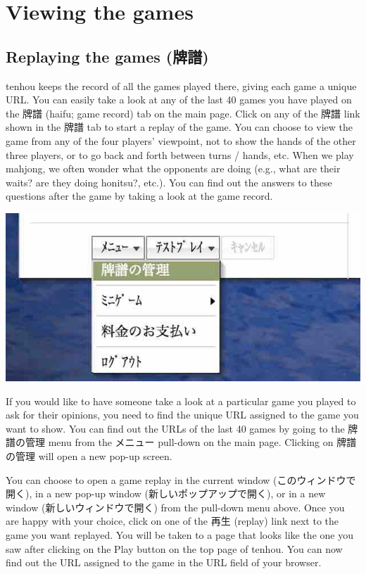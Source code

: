 \section{Viewing the games}
\subsection{Replaying the games (牌譜)}
{\jap tenhou} keeps the record of all the games played there, giving each game a unique URL. 
You can easily take a look at any of the last 40 games you have played on the 牌譜 ({\jap haifu}; game record) tab on the main page. Click on any of the 牌譜 link shown in the 牌譜 tab to start a replay of the game. You can choose to view the game from any of the four players' viewpoint, not to show the hands of the other three players, or to go back and forth between turns / hands, etc. When we play mahjong, we often wonder what the opponents are doing (e.g., what are their waits? are they doing {\jap honitsu}?, etc.). You can find out the answers to these questions after the game by taking a look at the game record. 


\begin{center}
\includegraphics[width=.4\textwidth,clip]{figs/haifukanri.jpg}
\end{center}

If you would like to have someone take a look at a particular game you played to ask for their opinions, you need to find the unique URL assigned to the game you want to show. You can find out the URLs of the last 40 games by going to the 牌譜の管理 menu from the メニュー pull-down on the main page. 
Clicking on 牌譜の管理 will open a new pop-up screen.

\bigskip
You can choose to open a game replay in the current window (このウィンドウで開く), in a new pop-up window (新しいポップアップで開く), or in a new window (新しいウィンドウで開く) from the pull-down menu above. Once you are happy with your choice, click on one of the 再生 (replay) link next to the game you want replayed. 
You will be taken to a page that looks like the one you saw after clicking on the Play button on the top page of {\jap tenhou}. You can now find out the URL assigned to the game in the URL field of your browser. 

